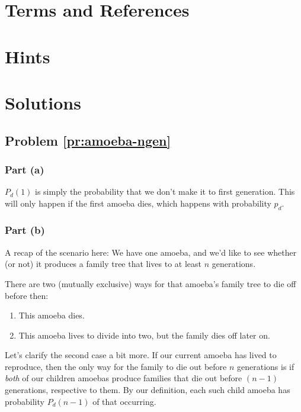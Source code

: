 
\newpage
\section{Terms and References}

\section{Hints}

\newpage
\section{Solutions}

\subsection{Problem \ref{pr:amoeba-ngen}}

\subsubsection{Part (a)}

$P_d(1)$ is simply the probability that we don't make it to first generation. This will only happen if the first amoeba dies, which happens with probability $p_d$.



\subsubsection{Part (b)}

A recap of the scenario here: We have one amoeba, and we'd like to see whether (or not) it produces a family tree that lives to at least $n$ generations.

There are two (mutually exclusive) ways for that amoeba's family tree to die off before then: 
\begin{enumerate}
\item This amoeba dies.
\item This amoeba lives to divide into two, but the family dies off later on.
\end{enumerate} \hfill

Let's clarify the second case a bit more. If our current amoeba has lived to reproduce, then the only way for the family to die out before $n$ generations is if \emph{both} of our children amoebas produce families that die out before $(n-1)$ generations, respective to them. By our definition, each such child amoeba has probability $P_d(n-1)$ of that occurring.

